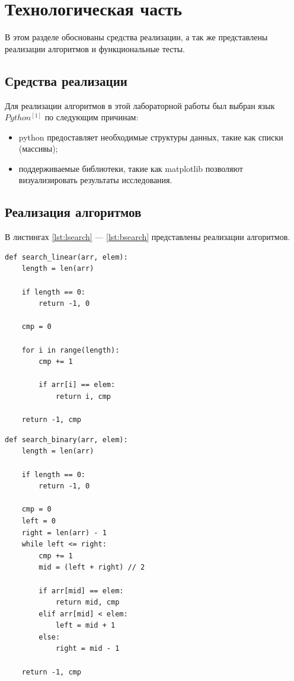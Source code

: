 \clearpage


\chapter{Технологическая часть}\label{ch:-2}

В этом разделе обоснованы средства реализации, а так же представлены реализации алгоритмов и функциональные тесты.


\section{Средства реализации}\label{sec:-2}

Для реализации алгоритмов в этой лабораторной работы был выбран язык $Python^{[1]}$ по следующим причинам:
\begin{itemize}
    \item python предоставляет необходимые структуры данных, такие как списки (массивы);
    \item поддерживаемые библиотеки, такие как matplotlib позволяют визуализировать результаты исследования.
\end{itemize}

\clearpage


\section{Реализация алгоритмов}

В листингах \ref{lst:lsearch} --- \ref{lst:bsearch} представлены реализации алгоритмов.

\begin{lstlisting}[style=python, label=lst:lsearch,caption=Алгоритм использующий полный перебор]
def search_linear(arr, elem):
    length = len(arr)

    if length == 0:
        return -1, 0

    cmp = 0

    for i in range(length):
        cmp += 1

        if arr[i] == elem:
            return i, cmp

    return -1, cmp
\end{lstlisting}


\begin{lstlisting}[style=python, label=lst:bsearch,caption=Алгоритм использующий бинарный поиск]
def search_binary(arr, elem):
    length = len(arr)

    if length == 0:
        return -1, 0

    cmp = 0
    left = 0
    right = len(arr) - 1
    while left <= right:
        cmp += 1
        mid = (left + right) // 2

        if arr[mid] == elem:
            return mid, cmp
        elif arr[mid] < elem:
            left = mid + 1
        else:
            right = mid - 1

    return -1, cmp

\end{lstlisting}
\clearpage


